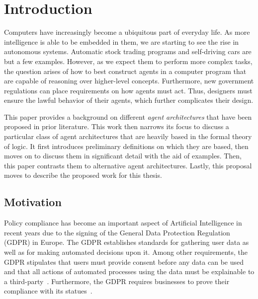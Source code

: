 \chapter{Introduction}

%
%


Computers have increasingly become a ubiquitous part of everyday life.
As more intelligence is able to be embedded in them, we are starting to see the rise in autonomous systems.
Automatic stock trading programs and self-driving cars are but a few examples.
However, as we expect them to perform more complex tasks, the question arises of how to best construct agents in a computer program that are capable of reasoning over higher-level concepts.
Furthermore, new government regulations can place requirements on how agents must act.
Thus, designers must ensure the lawful behavior of their agents, which further complicates their design.

This paper provides a background on different \textit{agent architectures} that have been proposed in prior literature.
This work then narrows its focus to discuss a particular class of agent architectures that are heavily based in the formal theory of logic.
It first introduces preliminary definitions on which they are based, then moves on to discuss them in significant detail with the aid of examples.
Then, this paper contrasts them to alternative agent architectures.
Lastly, this proposal moves to describe the proposed work for this thesis.

\section{Motivation}

Policy compliance has become an important aspect of Artificial Intelligence in recent years due to the signing of the General Data Protection Regulation (GDPR) in Europe.
The GDPR establishes standards for gathering user data as well as for making automated decisions upon it.
Among other requirements, the GDPR stipulates that users must provide consent before any data can be used and that all actions of automated processes using the data must be explainable to a third-party~\citep{sandra_wachter_artificial_2018}.
Furthermore, the GDPR requires businesses to prove their compliance with its statues~\citep{sandra_wachter_artificial_2018}.

